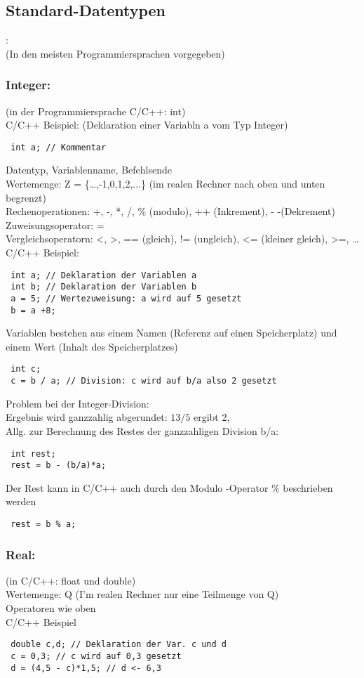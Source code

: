  \subsection{Standard-Datentypen}: \\
 (In den meisten Programmiersprachen vorgegeben)
 \subsubsection{Integer:} (in der Programmiersprache C/C++: int) \\
 C/C++ Beispiel: (Deklaration einer Variabln a vom Typ Integer) \\
 \begin{lstlisting}
 int a; // Kommentar
 \end{lstlisting} 
 Datentyp, Variablenname, Befehlsende \\
 Wertemenge: Z = \{\dots,-1,0,1,2,...\} (im realen Rechner nach oben und unten begrenzt) \\
 Rechenoperationen: +, -, *, /, \% (modulo), ++ (Inkrement), - -(Dekrement) \\
 Zuweisungsoperator: = \\
 Vergleichsoperatorn: <, >, == (gleich), != (ungleich), <= (kleiner gleich), >=, \dots \\
 C/C++ Beispiel: \\
 \begin{lstlisting}
 int a; // Deklaration der Variablen a
 int b; // Deklaration der Variablen b
 a = 5; // Wertezuweisung: a wird auf 5 gesetzt
 b = a +8;
 \end{lstlisting}
 Variablen bestehen aus einem Namen (Referenz auf einen Speicherplatz) und einem Wert (Inhalt des Speicherplatzes)
 \begin{lstlisting}
 int c;
 c = b / a; // Division: c wird auf b/a also 2 gesetzt
 \end{lstlisting}
 Problem bei der Integer-Division: \\
 Ergebnis wird ganzzahlig abgerundet: $13 / 5$ ergibt 2, \\
 Allg. zur Berechnung des Restes der ganzzahligen Division b/a:
 \begin{lstlisting}
 int rest;
 rest = b - (b/a)*a;
 \end{lstlisting}
 Der Rest kann in C/C++ auch durch den Modulo -Operator \% beschrieben werden
 \begin{lstlisting}
 rest = b % a;
 \end{lstlisting}
 
 \subsubsection{Real:} (in C/C++: float und double) \\
 Wertemenge: Q (I'm realen Rechner nur eine Teilmenge von Q) \\
 Operatoren wie oben \\
 C/C++ Beispiel
 \begin{lstlisting}
 double c,d; // Deklaration der Var. c und d
 c = 0,3; // c wird auf 0,3 gesetzt
 d = (4,5 - c)*1,5; // d <- 6,3 
 \end{lstlisting}
 
